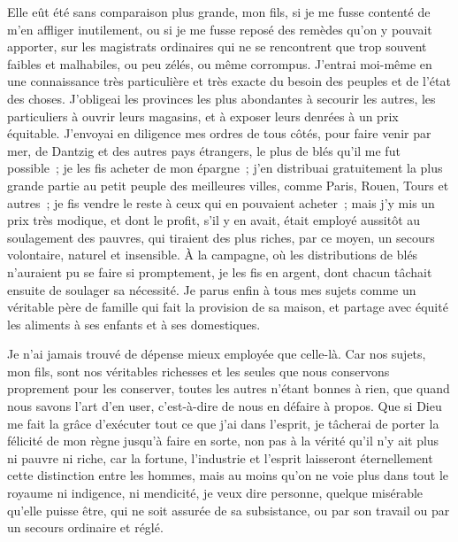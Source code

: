 \documentclass[french,twoside]{book} %
\begin{document}
Elle eût été sans comparaison plus grande, mon fils, si je me fusse contenté de m’en affliger inutilement, ou si je me fusse reposé des remèdes qu’on y pouvait apporter, sur les magistrats ordinaires qui ne se rencontrent que trop souvent faibles et malhabiles, ou peu zélés, ou même corrompus. J’entrai moi-même en une connaissance très particulière et très exacte du besoin des peuples et de l’état des choses. J’obligeai les provinces les plus abondantes à secourir les autres, les particuliers à ouvrir leurs magasins, et à exposer leurs denrées à un prix équitable. J’envoyai en diligence mes ordres de tous côtés, pour faire venir par mer, de Dantzig et des autres pays étrangers, le plus de blés qu’il me fut possible ; je les fis acheter de mon épargne ; j’en distribuai gratuitement la plus grande partie au petit peuple des meilleures villes, comme Paris, Rouen, Tours et autres ; je fis vendre le reste à ceux qui en pouvaient acheter ; mais j’y mis un prix très modique, et dont le profit, s’il y en avait, était employé aussitôt au soulagement des pauvres, qui tiraient des plus riches, par ce moyen, un secours volontaire, naturel et insensible. À la campagne, où les distributions de blés n’auraient pu se faire si promptement, je les fis en argent, dont chacun tâchait ensuite de soulager sa nécessité. Je parus enfin à tous mes sujets comme un véritable père de famille qui fait la provision de sa maison, et partage avec équité les aliments à ses enfants et à ses domestiques.\par
Je n’ai jamais trouvé de dépense mieux employée que celle-là. Car nos sujets, mon fils, sont nos véritables richesses et les seules que nous conservons proprement pour les conserver, toutes les autres n’étant bonnes à rien, que quand nous savons l’art d’en user, c’est-à-dire de nous en défaire à propos. Que si Dieu me fait la grâce d’exécuter tout ce que j’ai dans l’esprit, je tâcherai de porter la félicité de mon règne jusqu’à faire en sorte, non pas à la vérité qu’il n’y ait plus ni pauvre ni riche, car la fortune, l’industrie et l’esprit laisseront éternellement cette distinction entre les hommes, mais au moins qu’on ne voie plus dans tout le royaume ni indigence, ni mendicité, je veux dire personne, quelque misérable qu’elle puisse être, qui ne soit assurée de sa subsistance, ou par son travail ou par un secours ordinaire et réglé.\par
\end{document}
